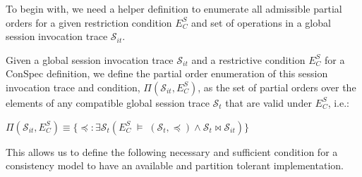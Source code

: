 \documentclass[journal, compsoc]{IEEEtran}
\begin{document}
	
	
	
	To begin with, we need a helper definition to enumerate all admissible partial orders for a given restriction condition $E^S_C$ and set of operations in a global session invocation trace $\mathcal{S}_{it}$.
	
	\begin{definition} \label{def:allpos}
		Given a global session invocation trace $\mathcal{S}_{it}$ and a restrictive condition $E^S_C$
		for a ConSpec definition, we define the partial order enumeration
		of this session invocation trace and condition, $\Pi(\mathcal{S}_{it},E^S_C)$, as
		the set of partial orders over the elements of any compatible global session trace $\mathcal{S}_{t}$ that are valid
		under $E^S_C$, i.e.:
		
		
		$\Pi(\mathcal{S}_{it},E^S_C) \equiv  \{\preccurlyeq: \exists \mathcal{S}_{t} \left(  E^S_C\; \vDash \; \left( {\mathcal{S}_{t}}, \preccurlyeq \right) \wedge \mathcal{S}_{t}\bowtie \mathcal{S}_{it} \right) \}$
	\end{definition}
	
	This allows us to define the following necessary and sufficient condition
	for a consistency model to have an available and partition tolerant
	implementation.
	
\end{document}
